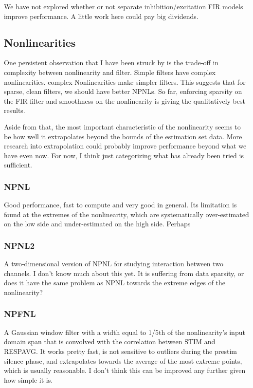 \documentclass[11pt]{article}
\begin{document}
    We have not explored whether or not separate inhibition/excitation FIR models improve performance. A little work here could pay big dividends. 

\subsection{Nonlinearities}
\label{sec-2.6}

   
   One persistent observation that I have been struck by is the trade-off in complexity between nonlinearity and filter.  Simple filters have complex nonlinearities. complex Nonlinearities make simpler filters.  This suggests that for sparse, clean filters, we should have better NPNLs. So far, enforcing sparsity on the FIR filter and smoothness on the nonlinearity is giving the qualitatively best results. 

   Aside from that, the most important characteristic of the nonlinearity seems to be how well it extrapolates beyond the bounds of the estimation set data. More research into extrapolation could probably improve performance beyond what we have even now. For now, I think just categorizing what has already been tried is sufficient. 

\subsubsection{NPNL}
\label{sec-2.6.1}


    Good performance, fast to compute and very good in general. Its limitation is found at the extremes of the nonlinearity, which are systematically over-estimated on the low side and under-estimated on the high side. Perhaps 

\subsubsection{NPNL2}
\label{sec-2.6.2}


    A two-dimensional version of NPNL for studying interaction between two channels. I don't know much about this yet. It is suffering from data sparsity, or does it have the same problem as NPNL towards the extreme edges of the nonlinearity?

\subsubsection{NPFNL}
\label{sec-2.6.3}


    A Gaussian window filter with a width equal to 1/5th of the nonlinearity's input domain span that is convolved with the correlation between STIM and RESPAVG. It works pretty fast, is not sensitive to outliers during the prestim silence phase, and extrapolates towards the average of the most extreme points, which is usually reasonable. I don't think this can be improved any further given how simple it is. 
\end{document}
